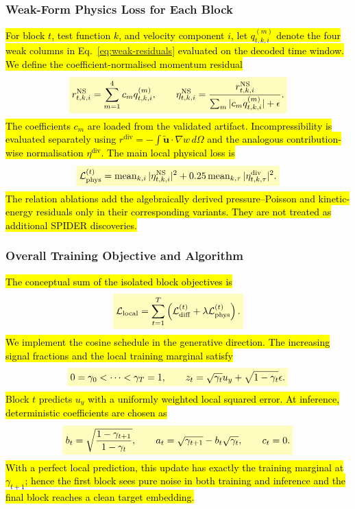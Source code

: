 \documentclass[preprint,12pt]{elsarticle}
\newcommand{\rev}[1]{\hl{#1}}
\newcommand{\revmath}[1]{\colorbox{yellow!25}{$#1$}}
\begin{document}
\subsubsection{Weak-Form Physics Loss for Each Block}
\label{sec:weak-physics-loss}

\rev{For block $t$, test function $k$, and velocity component $i$, let $q_{t,k,i}^{(m)}$ denote the four weak columns in Eq.~\eqref{eq:weak-residuals} evaluated on the decoded time window. We define the coefficient-normalised momentum residual}
\begin{equation}
\label{eq:normalised-ns-residual}
\revmath{\displaystyle
r_{t,k,i}^{\mathrm{NS}}=\sum_{m=1}^{4}c_mq_{t,k,i}^{(m)},\qquad
\eta_{t,k,i}^{\mathrm{NS}}=
\frac{r_{t,k,i}^{\mathrm{NS}}}
{\sum_m|c_mq_{t,k,i}^{(m)}|+\epsilon}.}
\end{equation}
\rev{The coefficients $c_m$ are loaded from the validated artifact. Incompressibility is evaluated separately using $r^{\mathrm{div}}=-\int\tilde{\mathbf u}\cdot\nabla w\,d\Omega$ and the analogous contribution-wise normalisation $\eta^{\mathrm{div}}$. The main local physical loss is}
\begin{equation}
\label{eq:physics-loss}
\revmath{\displaystyle
\mathcal{L}_{\mathrm{phys}}^{(t)}=
\operatorname{mean}_{k,i}|\eta_{t,k,i}^{\mathrm{NS}}|^2
+0.25\operatorname{mean}_{k,\tau}|\eta_{t,k,\tau}^{\mathrm{div}}|^2.}
\end{equation}
\rev{The relation ablations add the algebraically derived pressure--Poisson and kinetic-energy residuals only in their corresponding variants. They are not treated as additional SPIDER discoveries.}

\subsubsection{Overall Training Objective and Algorithm}
\label{sec:overall-objective}

\rev{The conceptual sum of the isolated block objectives is}
\begin{equation}
\label{eq:total-loss}
\revmath{\displaystyle
\mathcal{L}_{\mathrm{local}}=\sum_{t=1}^T
\left(\mathcal{L}_{\mathrm{diff}}^{(t)}+\lambda\mathcal{L}_{\mathrm{phys}}^{(t)}\right).}
\end{equation}
\rev{We implement the cosine schedule in the generative direction. The increasing signal fractions and the local training marginal satisfy}
\begin{equation*}
\revmath{\displaystyle
0=\gamma_0<\cdots<\gamma_T=1,\qquad
z_t=\sqrt{\gamma_t}u_y+\sqrt{1-\gamma_t}\epsilon.}
\end{equation*}
\rev{Block $t$ predicts $u_y$ with a uniformly weighted local squared error. At inference, deterministic coefficients are chosen as}
\begin{equation}
\label{eq:consistent-schedule}
\revmath{\displaystyle
b_t=\sqrt{\frac{1-\gamma_{t+1}}{1-\gamma_t}},\qquad
a_t=\sqrt{\gamma_{t+1}}-b_t\sqrt{\gamma_t},\qquad c_t=0.}
\end{equation}
\rev{With a perfect local prediction, this update has exactly the training marginal at $\gamma_{t+1}$; hence the first block sees pure noise in both training and inference and the final block reaches a clean target embedding.}
\end{document}
